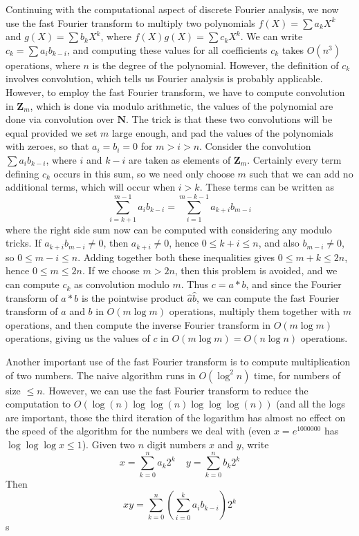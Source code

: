 Continuing with the computational aspect of discrete Fourier analysis, we now use the fast Fourier transform to multiply two polynomials $f(X) = \sum a_k X^k$ and $g(X) = \sum b_k X^k$, where $f(X)g(X) = \sum c_k X^k$. We can write $c_k = \sum a_i b_{k-i}$, and computing these values for all coefficients $c_k$ takes $O(n^3)$ operations, where $n$ is the degree of the polynomial. However, the definition of $c_k$ involves convolution, which tells us Fourier analysis is probably applicable. However, to employ the fast Fourier transform, we have to compute convolution in $\mathbf{Z}_m$, which is done via modulo arithmetic, the values of the polynomial are done via convolution over $\mathbf{N}$. The trick is that these two convolutions will be equal provided we set $m$ large enough, and pad the values of the polynomials with zeroes, so that $a_i = b_i = 0$ for $m > i > n$. Consider the convolution $\sum a_i b_{k-i}$, where $i$ and $k-i$ are taken as elements of $\mathbf{Z}_m$. Certainly every term defining $c_k$ occurs in this sum, so we need only choose $m$ such that we can add no additional terms, which will occur when $i > k$. These terms can be written as
%
\[ \sum_{i = k+1}^{m-1} a_i b_{k-i} = \sum_{i = 1}^{m-k-1} a_{k+i} b_{m-i} \]
%
where the right side sum now can be computed with considering any modulo tricks. If $a_{k + i} b_{m-i} \neq 0$, then $a_{k+i} \neq 0$, hence $0 \leq k+i \leq n$, and also $b_{m-i} \neq 0$, so $0 \leq m-i \leq n$. Adding together both these inequalities gives $0 \leq m+k \leq 2n$, hence $0 \leq m \leq 2n$. If we choose $m > 2n$, then this problem is avoided, and we can compute $c_k$ as convolution modulo $m$. Thus $c = a * b$, and since the Fourier transform of $a*b$ is the pointwise product $\hat{a} \hat{b}$, we can compute the fast Fourier transform of $a$ and $b$ in $O(m \log m)$ operations, multiply them together with $m$ operations, and then compute the inverse Fourier transform in $O(m \log m)$ operations, giving us the values of $c$ in $O(m \log m) = O(n \log n)$ operations.

Another important use of the fast Fourier transform is to compute multiplication of two numbers. The naive algorithm runs in $O(\log^2 n)$ time, for numbers of size $\leq n$. However, we can use the fast Fourier transform to reduce the computation to $O(\log (n) \log \log (n) \log \log \log (n))$ (and all the logs are important, those the third iteration of the logarithm has almost no effect on the speed of the algorithm for the numbers we deal with (even $x = e^{1000000}$ has $\log \log \log x \leq 1$). Given two $n$ digit numbers $x$ and $y$, write
%
\[ x = \sum_{k = 0}^n a_k 2^k\ \ \ \ \ y = \sum_{k = 0}^n b_k 2^k \]
%
Then
%
\[ xy = \sum_{k = 0}^n \left( \sum_{i = 0}^k a_i b_{k-i} \right) 2^k \]
%
s

